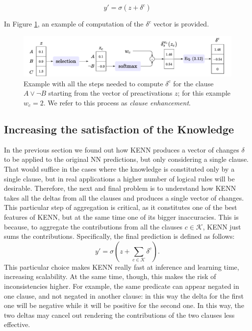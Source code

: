 $$y' = \sigma(z + \delta^c)$$

In Figure \ref{fig:delta_single_clause}, an example of computation of the $\delta^ c$ vector is provided.

\begin{figure}[h!]
	\centering
	\includegraphics[width=\linewidth]{figures/delta_single_clause.pdf}
	\caption{Example with all the steps needed to compute $\delta^c$ for the clause $A \vee \neg B$ starting from the vector of preactivations $z$; for this example $w_c=2$. We refer to this process as \textit{clause enhancement}.}
	\label{fig:delta_single_clause}
\end{figure}


\subsection{Increasing the satisfaction of the Knowledge}
In the previous section we found out how KENN produces a vector of changes $\delta$ to be applied to the original NN predictions, but only considering a single clause. That would suffice in the cases where the knowledge is constituted only by a single clause, but in real applications a higher number of logical rules will be desirable. Therefore, the next and final problem is to understand how KENN takes all the deltas from all the clauses and produces a single vector of changes. This particular step of aggregation is critical, as it constitutes one of the best features of KENN, but at the same time one of its bigger inaccuracies. This is because, to aggregate the contributions from all the clauses $c \in \mathcal{K}$, KENN just sums the contributions. Specifically, the final prediction is defined as follows:
\begin{equation}
\label{eq:deltas_sum}
y'=\sigma(z + \sum_{c\in\mathcal{K}}\delta^c).
\end{equation}
This particular choice makes KENN really fast at inference and learning time, increasing scalability. At the same time, though, this makes the risk of inconsistencies higher. For example, the same predicate can appear negated in one clause, and not negated in another clause: in this way the delta for the first one will be negative while it will be positive for the second one. In this way, the two deltas may cancel out rendering the contributions of the two clauses less effective.


